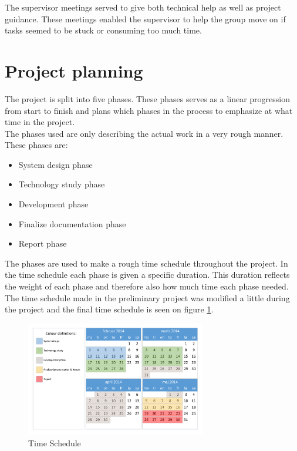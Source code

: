 The supervisor meetings served to give both technical help as well as project guidance. These meetings enabled the supervisor to help the group move on if tasks seemed to be stuck or consuming too much time.

\section{Project planning}
The project is split into five phases. These phases serves as a linear progression from start to finish and plans which phases in the process to emphasize at what time in the project.\\
The phases used are only describing the actual work in a very rough manner. These phases are:

\begin{itemize}
	\item System design phase
	\item Technology study phase
	\item Development phase
	\item Finalize documentation phase
	\item Report phase
	\label{it:phases}
\end{itemize}

The phases are used to make a rough time schedule throughout the project. In the time schedule each phase is given a specific duration. This duration reflects the weight of each phase and therefore also how much time each phase needed. The time schedule made in the preliminary project was modified a little during the project and the final time schedule is seen on figure \ref{fig:TimeSched}.

\begin{figure}[hbpt]
	\centering
	\includegraphics[width=0.7\textwidth]{billeder/9projectexecution/Timeschedule_neat}
	\caption{Time Schedule}
	\label{fig:TimeSched}
\end{figure}


